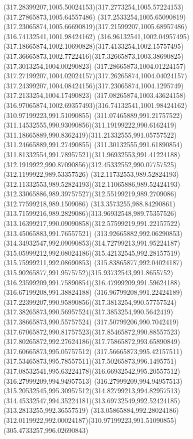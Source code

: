 {{\curveto(317.28399207,1005.50024153)(317.2773254,1005.57224153)(317.27865873,1005.64557486)
\curveto(317.2533254,1005.65090819)(317.23065874,1005.66690819)(317.21599207,1005.68957486)
\moveto(316.74132541,1001.98424162)
\curveto(316.96132541,1002.04957495)(317.18665874,1002.10690828)(317.4133254,1002.15757495)
\curveto(317.36665873,1002.7722416)(317.32665873,1003.38690825)(317.3013254,1004.00290823)
\curveto(317.28665873,1004.01224157)(317.27199207,1004.02024157)(317.26265874,1004.04024157)
\curveto(317.24399207,1004.08424156)(317.23065874,1004.1295749)(317.2133254,1004.17490823)
\curveto(317.08265874,1003.43624158)(316.97065874,1002.69357493)(316.74132541,1001.98424162)
\moveto(310.97199223,991.51090855)
\curveto(311.07465889,991.21757522)(311.14532555,990.93090856)(311.19199222,990.6162419)
\curveto(311.18665889,990.8362419)(311.21332555,991.05757522)(311.24665889,991.27490855)
\curveto(311.30132555,991.61890854)(311.81332554,991.78957521)(311.96932553,991.41224188)
\curveto(312.1919922,990.87090856)(312.45332552,990.07757525)(312.1199922,989.53357526)
\curveto(312.11732553,989.52824193)(312.11332553,989.52824193)(312.11065886,989.52424193)
\curveto(312.33065886,989.39757527)(312.55199219,989.2709086)(312.77599218,989.1509086)
\curveto(313.3573255,988.84290861)(313.71599216,989.2829086)(313.96932548,989.75357526)
\curveto(313.16399217,990.09090858)(312.57599219,991.22157522)(313.45065883,991.76557521)
\curveto(313.92665882,992.06290853)(314.34932547,992.09090853)(314.72799213,991.95224187)
\curveto(315.05999212,992.08024186)(315.42132545,992.28157519)(315.75999211,992.08690853)
\curveto(315.83865877,992.04024187)(315.90265877,991.9575752)(315.93732543,991.8655752)
\curveto(316.23599209,991.75890854)(316.47999209,991.59624188)(316.67199208,991.38824188)
\curveto(316.96799208,991.22424189)(317.22399207,990.95890856)(317.3813254,990.57757524)
\curveto(317.38265873,990.56957524)(317.3853254,990.5642419)(317.38665873,990.55757524)
\curveto(317.50799206,990.7042419)(317.67065872,990.81757523)(317.85465872,990.88557523)
\curveto(317.80265872,992.27624186)(317.75865872,993.65890849)(317.60665873,995.05757512)
\curveto(317.56665873,995.42157511)(317.53465873,995.78557511)(317.50265873,996.1495751)
\curveto(317.08532541,995.63224178)(316.66932542,995.20557512)(316.27999209,994.94957513)
\curveto(316.27999209,994.94957513)(315.20532545,995.30957512)(314.82799213,994.82957513)
\curveto(314.45332547,994.35224181)(313.69732549,992.52424185)(313.2813255,992.36557519)
\curveto(313.05865884,992.28024186)(312.0119922,992.00024187)(310.97199223,991.51090855)
\moveto(305.4733257,996.02690843)
}}
